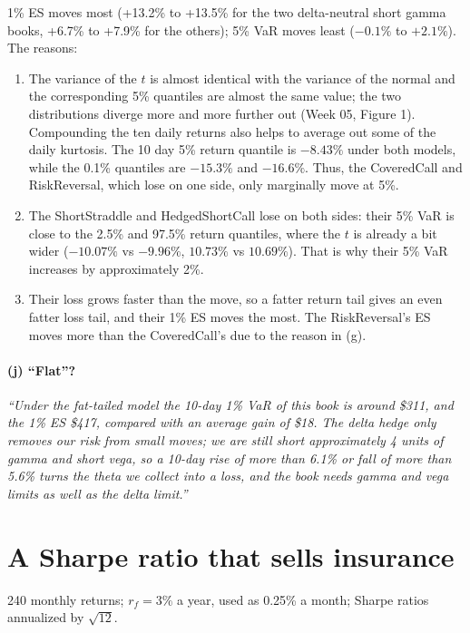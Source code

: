 \documentclass[11pt]{article}
\begin{document}
1\% ES moves most (+13.2\% to +13.5\% for the two delta-neutral short gamma books, +6.7\% to +7.9\% for the others); 5\% VaR moves least ($-0.1\%$ to $+2.1\%$). The reasons:
\begin{enumerate}\setlength\itemsep{0.1em}
\item The variance of the $t$ is almost identical with the variance of the normal and the corresponding 5\% quantiles are almost the same value; the two distributions diverge more and more further out (Week 05, Figure 1). Compounding the ten daily returns also helps to average out some of the daily kurtosis. The 10 day 5\% return quantile is $-8.43\%$ under both models, while the 0.1\% quantiles are $-15.3\%$ and $-16.6\%$. Thus, the CoveredCall and RiskReversal, which lose on one side, only marginally move at 5\%.
\item The ShortStraddle and HedgedShortCall lose on both sides: their 5\% VaR is close to the 2.5\% and 97.5\% return quantiles, where the $t$ is already a bit wider ($-10.07\%$ vs $-9.96\%$, $10.73\%$ vs $10.69\%$). That is why their 5\% VaR increases by approximately 2\%.
\item Their loss grows faster than the move, so a fatter return tail gives an even fatter loss tail, and their 1\% ES moves the most. The RiskReversal's ES moves more than the CoveredCall's due to the reason in (g).
\end{enumerate}

\paragraph{(j) ``Flat''?} \emph{``Under the fat-tailed model the 10-day 1\% VaR of this book is around \$311, and the 1\% ES \$417, compared with an average gain of \$18. The delta hedge only removes our risk from small moves; we are still short approximately 4 units of gamma and short vega, so a 10-day rise of more than 6.1\% or fall of more than 5.6\% turns the theta we collect into a loss, and the book needs gamma and vega limits as well as the delta limit.''}

\section{A Sharpe ratio that sells insurance}

240 monthly returns; $r_f=3\%$ a year, used as 0.25\% a month; Sharpe ratios annualized by $\sqrt{12}$.
\end{document}

